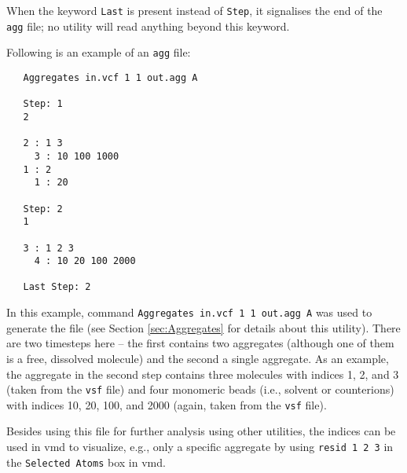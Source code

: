 When the keyword \texttt{Last} is present instead of \texttt{Step}, it
signalises the end of the \texttt{agg} file; no utility will read anything
beyond this keyword.

Following is an example of an \texttt{agg} file:

\begin{verbatim}
   Aggregates in.vcf 1 1 out.agg A

   Step: 1
   2

   2 : 1 3
     3 : 10 100 1000
   1 : 2
     1 : 20

   Step: 2
   1

   3 : 1 2 3
     4 : 10 20 100 2000

   Last Step: 2
\end{verbatim}

In this example, command \texttt{Aggregates in.vcf 1 1 out.agg A} was used
to generate the file (see Section \ref{sec:Aggregates} for details about
this utility). There are two timesteps here -- the first contains two
aggregates (although one of them is a free, dissolved molecule) and the
second a single aggregate.  As an example, the aggregate in the second step
contains three molecules with indices 1, 2, and 3 (taken from the
\texttt{vsf} file) and four monomeric beads (i.e., solvent or counterions)
with indices 10, 20, 100, and 2000 (again, taken from the \texttt{vsf}
file).

Besides using this file for further analysis using other utilities, the
indices can be used in vmd to visualize, e.g., only a specific aggregate by
using \texttt{resid 1 2 3} in the \texttt{Selected Atoms} box in vmd.
